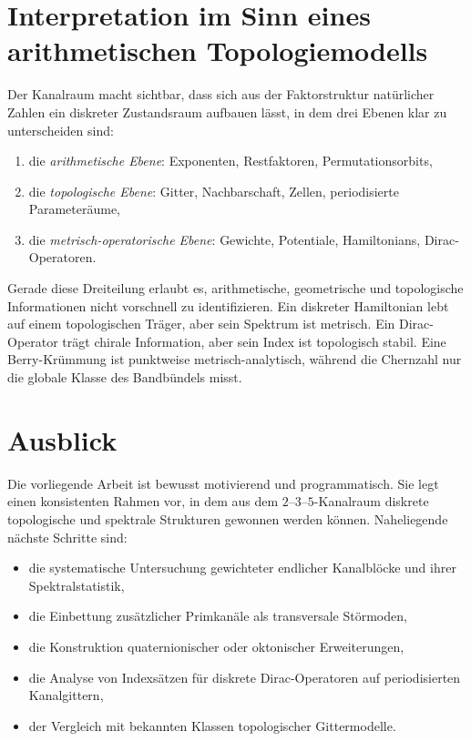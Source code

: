 \documentclass[11pt,a4paper]{article}
\theoremstyle{remark}
\begin{document}
	\section{Interpretation im Sinn eines arithmetischen Topologiemodells}
	
	Der Kanalraum macht sichtbar, dass sich aus der Faktorstruktur natürlicher Zahlen ein diskreter Zustandsraum aufbauen lässt, in dem drei Ebenen klar zu unterscheiden sind:
	\begin{enumerate}[label=(\arabic*)]
		\item die \emph{arithmetische Ebene}: Exponenten, Restfaktoren, Permutationsorbits,
		\item die \emph{topologische Ebene}: Gitter, Nachbarschaft, Zellen, periodisierte Parameteräume,
		\item die \emph{metrisch-operatorische Ebene}: Gewichte, Potentiale, Hamiltonians, Dirac-Operatoren.
	\end{enumerate}
	
	Gerade diese Dreiteilung erlaubt es, arithmetische, geometrische und topologische Informationen nicht vorschnell zu identifizieren. Ein diskreter Hamiltonian lebt auf einem topologischen Träger, aber sein Spektrum ist metrisch. Ein Dirac-Operator trägt chirale Information, aber sein Index ist topologisch stabil. Eine Berry-Krümmung ist punktweise metrisch-analytisch, während die Chernzahl nur die globale Klasse des Bandbündels misst.
	
	\section{Ausblick}
	
	Die vorliegende Arbeit ist bewusst motivierend und programmatisch. Sie legt einen konsistenten Rahmen vor, in dem aus dem $2$--$3$--$5$-Kanalraum diskrete topologische und spektrale Strukturen gewonnen werden können. Naheliegende nächste Schritte sind:
	\begin{itemize}
		\item die systematische Untersuchung gewichteter endlicher Kanalblöcke und ihrer Spektralstatistik,
		\item die Einbettung zusätzlicher Primkanäle als transversale Störmoden,
		\item die Konstruktion quaternionischer oder oktonischer Erweiterungen,
		\item die Analyse von Indexsätzen für diskrete Dirac-Operatoren auf periodisierten Kanalgittern,
		\item der Vergleich mit bekannten Klassen topologischer Gittermodelle.
	\end{itemize}
	
\end{document}
